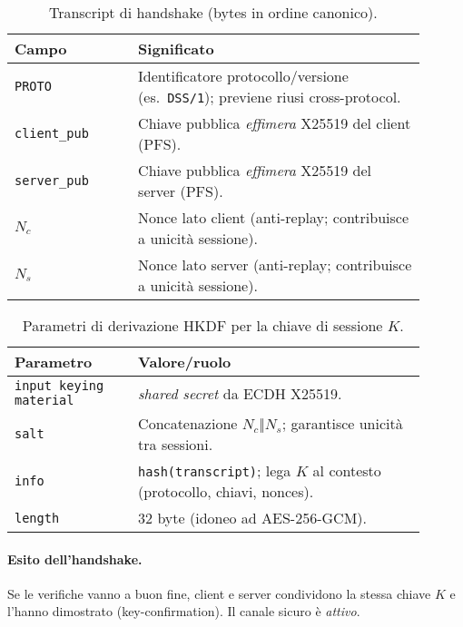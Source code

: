 \begin{table}[h]
  \centering
  \caption{Transcript di handshake (bytes in ordine canonico).}
  \label{tab:transcript}
  \begin{tabular}{@{}p{0.27\linewidth}p{0.63\linewidth}@{}}
    \toprule
    \textbf{Campo} & \textbf{Significato} \\
    \midrule
    \texttt{PROTO} & Identificatore protocollo/versione (es.\ \texttt{DSS/1}); previene riusi cross-protocol. \\
    \texttt{client\_pub} & Chiave pubblica \emph{effimera} X25519 del client (PFS). \\
    \texttt{server\_pub} & Chiave pubblica \emph{effimera} X25519 del server (PFS). \\
    \texttt{$N_c$} & Nonce lato client (anti-replay; contribuisce a unicità sessione). \\
    \texttt{$N_s$} & Nonce lato server (anti-replay; contribuisce a unicità sessione). \\
    \bottomrule
  \end{tabular}
\end{table}

\begin{table}[h]
  \centering
  \caption{Parametri di derivazione HKDF per la chiave di sessione $K$.}
  \label{tab:hkdf}
  \begin{tabular}{@{}p{0.27\linewidth}p{0.63\linewidth}@{}}
    \toprule
    \textbf{Parametro} & \textbf{Valore/ruolo} \\
    \midrule
    \texttt{input keying material} & \emph{shared secret} da ECDH X25519. \\
    \texttt{salt} & Concatenazione \texttt{$N_c \Vert N_s$}; garantisce unicità tra sessioni. \\
    \texttt{info} & \texttt{hash(transcript)}; lega $K$ al contesto (protocollo, chiavi, nonces). \\
    \texttt{length} & 32 byte (idoneo ad AES-256-GCM). \\
    \bottomrule
  \end{tabular}
\end{table}

\paragraph{Esito dell'handshake.}
Se le verifiche vanno a buon fine, client e server condividono la stessa chiave $K$ e l'hanno dimostrato (key-confirmation). Il canale sicuro è \emph{attivo}.

